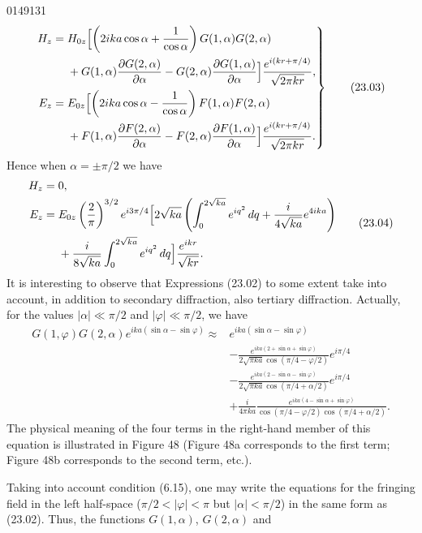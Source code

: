 \begin{scanpage}{0149}{131}
\[
\left.\begin{aligned}H_z={}&H_{0z}\Bigl[\left(2ika\cos\alpha+\frac1{\cos\alpha}\right)G(1,\alpha)G(2,\alpha)\\&+G(1,\alpha)\frac{\partial G(2,\alpha)}{\partial\alpha}-G(2,\alpha)\frac{\partial G(1,\alpha)}{\partial\alpha}\Bigr]\frac{e^{i(kr+\pi/4)}}{\sqrt{2\pi kr}},\\
E_z={}&E_{0z}\Bigl[\left(2ika\cos\alpha-\frac1{\cos\alpha}\right)F(1,\alpha)F(2,\alpha)\\&+F(1,\alpha)\frac{\partial F(2,\alpha)}{\partial\alpha}-F(2,\alpha)\frac{\partial F(1,\alpha)}{\partial\alpha}\Bigr]\frac{e^{i(kr+\pi/4)}}{\sqrt{2\pi kr}}.
\end{aligned}\right\}\tag{23.03}
\]
Hence when $\alpha=\pm\pi/2$ we have
\[
\begin{aligned}H_z={}&0,\\
E_z={}&E_{0z}\left(\frac2\pi\right)^{3/2}e^{i3\pi/4}\Bigl[2\sqrt{ka}\left(\int_0^{2\sqrt{ka}}e^{iq^2}\,dq+\frac{i}{4\sqrt{ka}}e^{4ika}\right)\\&+\frac{i}{8\sqrt{ka}}\int_0^{2\sqrt{ka}}e^{iq^2}\,dq\Bigr]\frac{e^{ikr}}{\sqrt{kr}}.
\end{aligned}\tag{23.04}
\]
It is interesting to observe that Expressions (23.02) to some extent take into account, in addition to secondary diffraction, also tertiary diffraction. Actually, for the values $|\alpha|\ll\pi/2$ and $|\varphi|\ll\pi/2$, we have
\[
\begin{aligned}G(1,\varphi)G(2,\alpha)e^{ika(\sin\alpha-\sin\varphi)}\approx{}&e^{ika(\sin\alpha-\sin\varphi)}\\
&-\frac{e^{ika(2+\sin\alpha+\sin\varphi)}}{2\sqrt{\pi ka}\cos(\pi/4-\varphi/2)}e^{i\pi/4}\\
&-\frac{e^{ika(2-\sin\alpha-\sin\varphi)}}{2\sqrt{\pi ka}\cos(\pi/4+\alpha/2)}e^{i\pi/4}\\
&+\frac{i}{4\pi ka}\frac{e^{ika(4-\sin\alpha+\sin\varphi)}}{\cos(\pi/4-\varphi/2)\cos(\pi/4+\alpha/2)}.
\end{aligned}\tag{23.05}
\]
The physical meaning of the four terms in the right-hand member of this equation is illustrated in Figure 48 (Figure 48a corresponds to the first term; Figure 48b corresponds to the second term, etc.).

Taking into account condition (6.15), one may write the equations for the fringing field in the left half-space ($\pi/2<|\varphi|<\pi$ but $|\alpha|<\pi/2$) in the same form as (23.02). Thus, the functions $G(1,\alpha)$, $G(2,\alpha)$ and
\end{scanpage}

